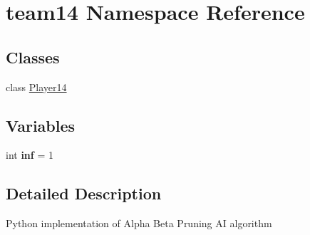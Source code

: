 \hypertarget{namespaceteam14}{}\section{team14 Namespace Reference}
\label{namespaceteam14}
\subsection*{Classes}
\begin{DoxyCompactItemize}
\item 
class \hyperlink{classteam14_1_1_player14}{Player14}
\end{DoxyCompactItemize}
\subsection*{Variables}
\begin{DoxyCompactItemize}
\item 
int {\bfseries inf} = 1\hypertarget{namespaceteam14_ab1927b8ab2a2ee77dc0d8626baeb6afd}{}\label{namespaceteam14_ab1927b8ab2a2ee77dc0d8626baeb6afd}

\end{DoxyCompactItemize}


\subsection{Detailed Description}
\begin{DoxyVerb}Python implementation of Alpha Beta Pruning AI algorithm
\end{DoxyVerb}
 